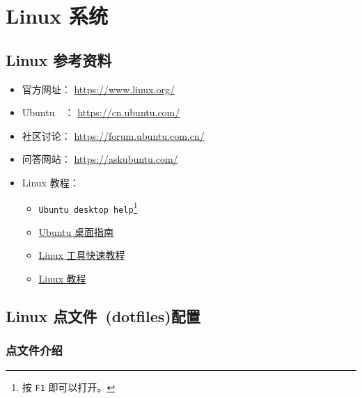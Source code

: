 \documentclass[
    11pt,
    base=hide,
    cite=authoryear,
    device=phone,
    lang=cn,
    mode=simple,
    result=answer,
    toc=onecol,
]{elegantbook_sierxue}
\begin{document}
\section{Linux 系统}%
\label{sec:linux-a}

\subsection{Linux 参考资料}%
\label{sub:linux-refs}

\begin{itemize}
    \item 官方网址： \href{https://www.linux.org/}{https://www.linux.org/}
    \item Ubuntu~~： \href{https://cn.ubuntu.com/}{https://cn.ubuntu.com/}
    \item 社区讨论：
        \href{https://forum.ubuntu.com.cn/}{https://forum.ubuntu.com.cn/}
    \item 问答网站：
        \href{https://askubuntu.com/}{https://askubuntu.com/}
    \item Linux 教程：
        \begin{itemize}
            \item \lstinline{Ubuntu desktop help}\footnote{
                按 \lstinline{F1} 即可以打开。}
            \item \href{https://help.ubuntu.com/lts/ubuntu-help/index.html}
                {Ubuntu 桌面指南}
            \item \href{https://linuxtools-rst.readthedocs.io/zh_CN/latest/}
                {Linux 工具快速教程}
            \item \href{https://dunwu.github.io/linux-tutorial/#/}
                {Linux 教程}
        \end{itemize}
\end{itemize}



\subsection{Linux 点文件~(dotfiles)配置}%
\label{sub:dotfiles-settings}

\subsubsection{点文件介绍}%
\label{ssub:dotfiles-settings-intro}
\end{document}
